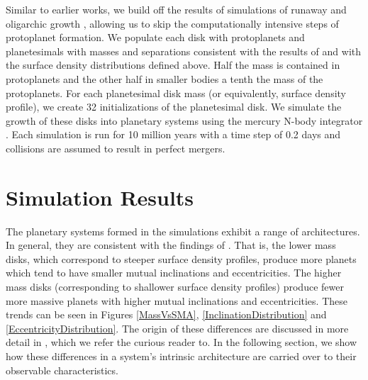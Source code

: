 \documentclass{emulateapj}
\begin{document}
Similar to earlier works, we build off the results of simulations of runaway and oligarchic growth \citep[e.g.][]{Kokubo02}, allowing us to skip the computationally intensive steps of protoplanet formation. We populate each disk with protoplanets and planetesimals with masses and separations consistent with the results of \citet[][ protoplanet separations of $\sim$ 7 mutual hill radii]{Kokubo02} and with the surface density distributions defined above. Half the mass is contained in protoplanets and the other half in smaller bodies a tenth the mass of the protoplanets. For each planetesimal disk mass (or equivalently, surface density profile), we create 32 initializations of the planetesimal disk. We simulate the growth of these disks into planetary systems using the mercury N-body integrator \citep{Chambers99}. Each simulation is run for 10 million years with a time step of 0.2 days and collisions are assumed to result in perfect mergers.

\section{Simulation Results}

The planetary systems formed in the simulations exhibit a range of architectures. In general, they are consistent with the findings of . That is, the lower mass disks, which correspond to steeper surface density profiles, produce more planets which tend to have smaller mutual inclinations and eccentricities. The higher mass disks (corresponding to shallower surface density profiles) produce fewer more massive planets with higher mutual inclinations and eccentricities. These trends can be seen in Figures \ref{MassVsSMA},  \ref{InclinationDistribution} and \ref{EccentricityDistribution}. The origin of these differences are discussed in more detail in , which we refer the curious reader to. In the following section, we show how these differences in a system's intrinsic architecture are carried over to their observable characteristics.
\end{document}
